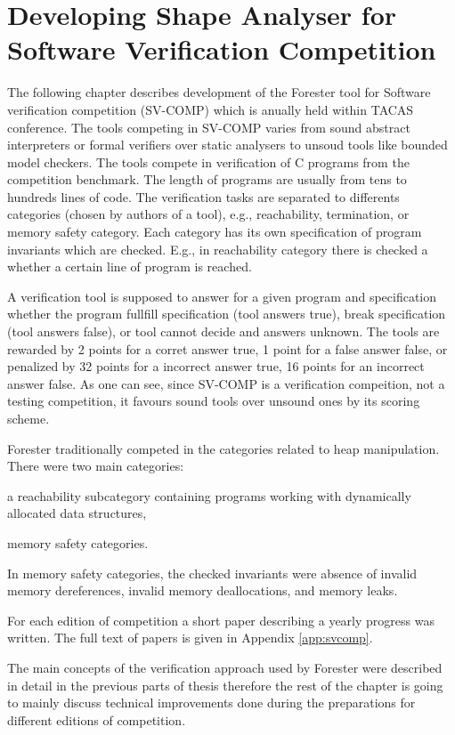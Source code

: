 {\chapter{Developing Shape Analyser for Software Verification Competition}
\label{ch:svcomp}
The following chapter describes development of the Forester tool \cite{foresterweb}
for Software verification competition \cite{svcompweb} (SV-COMP) which is anually held within TACAS conference.
The tools competing in SV-COMP varies from sound abstract interpreters or formal verifiers over static analysers
to unsoud tools like bounded model checkers.
The tools compete in verification of C programs from the competition benchmark.
The length of programs are usually from tens to hundreds lines of code.
The verification tasks are separated to differents categories (chosen by authors of a tool), e.g., reachability,
termination, or memory safety category.
Each category has its own specification of program invariants which are checked.
E.g., in reachability category there is checked a whether a certain line of program is reached.

A verification tool is supposed to answer for a given program and specification whether
the program fullfill specification (tool answers true), break specification (tool answers
false), or tool cannot decide and answers unknown.
The tools are rewarded by 2 points for a corret answer true, 1 point for a false answer false,
or penalized by 32 points for a incorrect answer true, 16 points for an incorrect answer false.
As one can see, since SV-COMP is a verification compeition, not a testing competition, it favours
sound tools over unsound ones by its scoring scheme.

Forester traditionally competed in the categories related to heap manipulation.
There were two main categories:
\begin{enumerate*}
  \item a reachability subcategory containing programs working with dynamically allocated data structures,
  \item memory safety categories.
\end{enumerate*}
In memory safety categories, the checked invariants were absence of invalid memory dereferences,
invalid memory deallocations, and memory leaks.

For each edition of competition a short paper describing a yearly progress was written.
The full text of papers is given in Appendix \ref{app:svcomp}.

The main concepts of the verification approach used by Forester were described in detail in the previous parts of thesis
therefore the rest of the chapter is going to mainly discuss technical improvements done during the preparations for different editions of competition.

}
